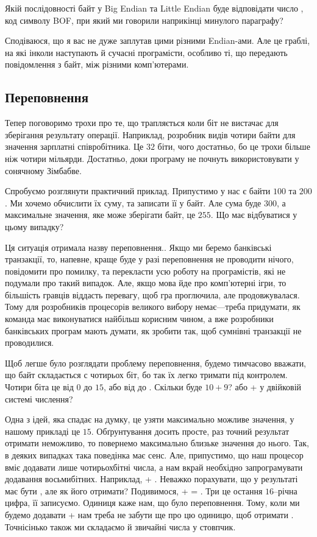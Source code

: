 \begin{exercise}
Якій послідовності байт у Big Endian та Little Endian буде відповідати число , код символу BOF, при який ми говорили наприкінці минулого параграфу?
\end{exercise}

Сподіваюся, що я вас не дуже заплутав цими різними Endian-ами.
Але це граблі, на які інколи наступають й сучасні програмісти, особливо ті, що передають повідомлення з байт, між різними комп'ютерами.

\subsection{Переповнення}

Тепер поговоримо трохи про те, що трапляється коли біт не вистачає для зберігання результату операції.
Наприклад, розробник видів чотири байти для значення зарплатні співробітника.
Це $32$ біти, чого достатньо, бо це трохи більше ніж чотири мільярди.
Достатньо, доки програму не почнуть використовувати у сонячному Зімбабве.

Спробуємо розглянути практичний приклад.
Припустимо у нас є байти $100$ та $200$.
Ми хочемо обчислити їх суму, та записати її у байт.
Але сума буде $300$, а максимальне значення, яке може зберігати байт, це $255$.
Що має відбуватися у цьому випадку?

Ця ситуація отримала назву переповнення..
Якщо ми беремо банківські транзакції, то, напевне, краще буде у разі переповнення не проводити нічого, повідомити про помилку, та перекласти усю роботу на програмістів, які не подумали про такий випадок.
Але, якщо мова йде про комп'ютерні ігри, то більшість гравців віддасть перевагу, щоб гра проглючила, але продовжувалася.
Тому для розробників процесорів великого вибору немає---треба придумати, як команда має виконуватися найбільш корисним чином, а вже розробники банківських програм мають думати, як зробити так, щоб сумнівні транзакції не проводилися.

Щоб легше було розглядати проблему переповнення, будемо тимчасово вважати, що байт складається с чотирьох біт, бо так їх легко тримати під контролем.
Чотири біта це від $0$ до $15$, або від  до .
Скільки буде $10 + 9$? або  +  у двійковій системі числення?

Одна з ідей, яка спадає на думку, це узяти максимально можливе значення, у нашому прикладі це $15$.
Обґрунтування досить просте, раз точний результат отримати неможливо, то повернемо максимально близьке значення до нього.
Так, в деяких випадках така поведінка має сенс.
Але, припустимо, що наш процесор вміє додавати лише чотирьохбітні числа, а нам вкрай необхідно запрограмувати додавання восьмибітних.
Наприклад,  + .
Неважко порахувати, що у результаті має бути , але як його отримати?
Подивимося,  +  = .
Три це остання $16$--річна цифра, її записуємо.
Одиниця каже нам, що було переповнення.
Тому, коли ми будемо додавати  +  нам треба не забути ще про цю одиницю, щоб отримати .
Точнісінько також ми складаємо й звичайні числа у стовпчик.

